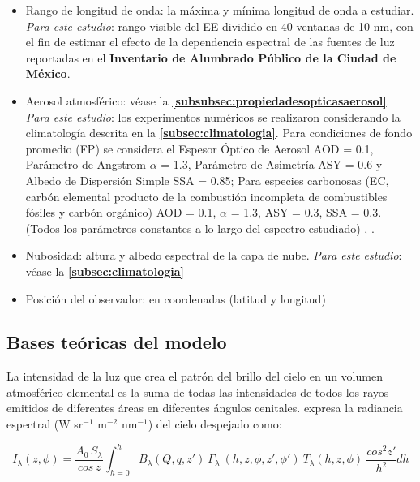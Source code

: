 \begin{itemize}

    \item Rango de longitud de onda: la máxima y mínima longitud de onda a estudiar. \textit{Para este estudio}: rango visible del EE dividido en 40 ventanas de 10 nm, con el fin  de estimar el efecto de la dependencia espectral de las fuentes de luz reportadas en el \textbf{Inventario de Alumbrado Público de la Ciudad de México}.
    
    \item Aerosol atmosférico: véase la \textbf{\autoref{subsubsec:propiedadesopticasaerosol}}. \textit{Para este estudio}: los experimentos numéricos se realizaron considerando la climatología descrita en la \textbf{\autoref{subsec:climatologia}}. Para condiciones de fondo promedio (FP) se considera el Espesor Óptico de Aerosol AOD = 0.1, Parámetro de Angstrom $\alpha$ = 1.3, Parámetro de Asimetría ASY = 0.6 y Albedo de Dispersión Simple SSA = 0.85; Para especies carbonosas (EC, carbón elemental producto de la combustión incompleta de combustibles fósiles y carbón orgánico) AOD = 0.1, $\alpha$ = 1.3, ASY = 0.3, SSA = 0.3. (Todos los parámetros constantes a lo largo del espectro estudiado) \citep{Penner1998}, \citep{Schmidt2010}.
    
    \item Nubosidad: altura y albedo espectral de la capa de nube. \textit{Para este estudio}: véase la \textbf{\autoref{subsec:climatologia}}
    
    \item Posición del observador: en coordenadas (latitud y longitud) 
    
\end{itemize}

\subsection{Bases teóricas del modelo}

La intensidad de la luz que crea el patrón del brillo del cielo en un volumen atmosférico elemental es la suma de todas las intensidades de todos los rayos emitidos de diferentes áreas en diferentes ángulos cenitales. \cite{Kocifaj2007} expresa la radiancia espectral (W sr$^{-1}$  m$^{-2}$ nm$^{-1}$) del cielo despejado como:

\begin{equation}\label{eq:2.1}
I_{\lambda}(z, \phi) = \frac{A_{0}\, S_{\lambda}}{cos\,z} \int_{h=0}^{h} B_{\lambda}(Q, q, z') \: \Gamma_{\lambda} \:(h, z, \phi, z', \phi') \: T_{\lambda}(h, z, \phi) \: \frac{cos^{2}z'}{h^{2}} dh
\end{equation}

